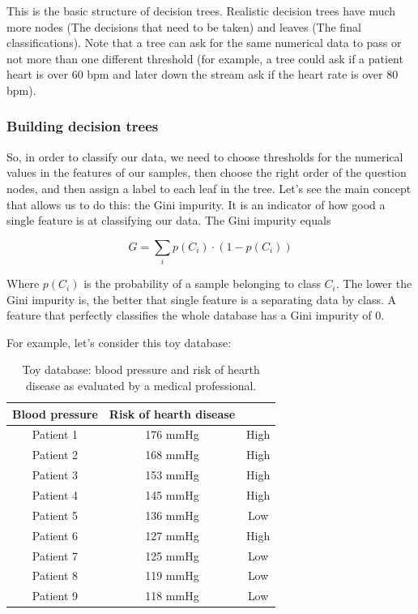 \documentclass[a4paper]{report}
\begin{document}
This is the basic structure of decision trees.
Realistic decision trees have much more nodes (The decisions that need to be taken) and leaves (The final classifications).
Note that a tree can ask for the same numerical data to pass or not more than one different threshold (for example, a tree could ask if a patient heart is over 60 bpm and later down the stream ask if the heart rate is over 80 bpm).

\subsubsection{Building decision trees}

So, in order to classify our data, we need to choose thresholds for the numerical values in the features of our samples, then choose the right order of the question nodes, and then assign a label to each leaf in the tree.
Let's see the main concept that allows us to do this:
the Gini impurity.
It is an indicator of how good a single feature is at classifying our data.
The Gini impurity equals

\begin{equation}
    G = \sum_i p(C_i) \cdot (1 - p(C_i))
\end{equation}

Where $p(C_i)$ is the probability of a sample belonging to class $C_i$.
The lower the Gini impurity is, the better that single feature is a separating data by class.
A feature that perfectly classifies the whole database has a Gini impurity of 0.

For example, let's consider this toy database:

\begin{table}[H]
  \begin{center}
    \begin{tabular}{c|c|c} %
      \textbf{Blood pressure} & \textbf{Risk of hearth disease}\\
      \hline
      Patient 1 &  176 mmHg & High\\
      Patient 2 &  168 mmHg & High\\
      Patient 3 &  153 mmHg & High\\
      Patient 4 &  145 mmHg & High\\
      Patient 5 &  136 mmHg & Low\\
      Patient 6 &  127 mmHg & High\\
      Patient 7 &  125 mmHg & Low\\
      Patient 8 &  119 mmHg & Low\\
      Patient 9 &  118 mmHg & Low\\
    \end{tabular}
    \caption{Toy database: blood pressure and risk of hearth disease as evaluated by a medical professional.}
    \label{tree_table}
  \end{center}
\end{table}
\end{document}
